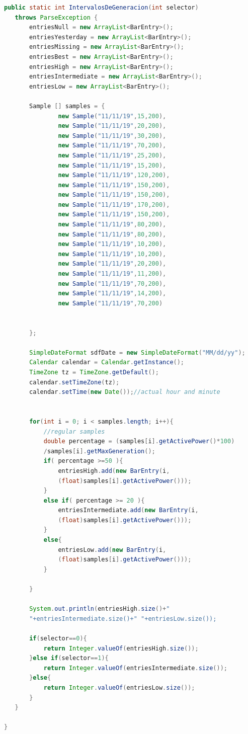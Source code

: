 \begin{lstlisting}[language= Java, frame=single]
   public static int IntervalosDeGeneracion(int selector)
   throws ParseException {
       entriesNull = new ArrayList<BarEntry>();
       entriesYesterday = new ArrayList<BarEntry>();
       entriesMissing = new ArrayList<BarEntry>();
       entriesBest = new ArrayList<BarEntry>();
       entriesHigh = new ArrayList<BarEntry>();
       entriesIntermediate = new ArrayList<BarEntry>();
       entriesLow = new ArrayList<BarEntry>();

       Sample [] samples = {
               new Sample("11/11/19",15,200),
               new Sample("11/11/19",20,200),
               new Sample("11/11/19",30,200),
               new Sample("11/11/19",70,200),
               new Sample("11/11/19",25,200),
               new Sample("11/11/19",15,200),
               new Sample("11/11/19",120,200),
               new Sample("11/11/19",150,200),
               new Sample("11/11/19",150,200),
               new Sample("11/11/19",170,200),
               new Sample("11/11/19",150,200),
               new Sample("11/11/19",80,200),
               new Sample("11/11/19",80,200),
               new Sample("11/11/19",10,200),
               new Sample("11/11/19",10,200),
               new Sample("11/11/19",20,200),
               new Sample("11/11/19",11,200),
               new Sample("11/11/19",70,200),
               new Sample("11/11/19",14,200),
               new Sample("11/11/19",70,200)


       };

       SimpleDateFormat sdfDate = new SimpleDateFormat("MM/dd/yy");
       Calendar calendar = Calendar.getInstance();
       TimeZone tz = TimeZone.getDefault();
       calendar.setTimeZone(tz);
       calendar.setTime(new Date());//actual hour and minute


       for(int i = 0; i < samples.length; i++){
           //regular samples
           double percentage = (samples[i].getActivePower()*100)
           /samples[i].getMaxGeneration();
           if( percentage >=50 ){
               entriesHigh.add(new BarEntry(i, 
               (float)samples[i].getActivePower()));
           }
           else if( percentage >= 20 ){
               entriesIntermediate.add(new BarEntry(i,
               (float)samples[i].getActivePower()));
           }
           else{
               entriesLow.add(new BarEntry(i, 
               (float)samples[i].getActivePower()));
           }

       }

       System.out.println(entriesHigh.size()+" 
       "+entriesIntermediate.size()+" "+entriesLow.size());

       if(selector==0){
           return Integer.valueOf(entriesHigh.size());
       }else if(selector==1){
           return Integer.valueOf(entriesIntermediate.size());
       }else{
           return Integer.valueOf(entriesLow.size());
       }
   }

}

\end{lstlisting}

